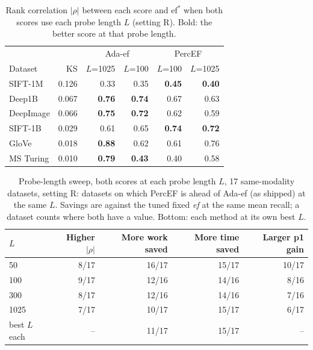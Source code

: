 \documentclass[sigconf, nonacm]{acmart}
\newcommand{\ef}{\textit{ef}}
\begin{document}
\begin{table}[t]
  \caption{Rank correlation $|\rho|$ between each score and $\mathrm{ef}^*$ when both scores use
  each probe length $L$ (setting R). Bold: the better score at that probe length.}
  \label{tab:ablation}
  \centering\footnotesize
  \begin{tabular}{lrrrrr}
    \toprule
    & & \multicolumn{2}{c}{Ada-ef} & \multicolumn{2}{c}{PercEF} \\
    Dataset & KS & $L$=1025 & $L$=100 & $L$=100 & $L$=1025 \\
    \midrule
    SIFT-1M   & 0.126 & 0.33 & 0.35 & \textbf{0.45} & \textbf{0.40} \\
    Deep1B    & 0.067 & \textbf{0.76} & \textbf{0.74} & 0.67 & 0.63 \\
    DeepImage & 0.066 & \textbf{0.75} & \textbf{0.72} & 0.62 & 0.59 \\
    SIFT-1B   & 0.029 & 0.61 & 0.65 & \textbf{0.74} & \textbf{0.72} \\
    GloVe     & 0.018 & \textbf{0.88} & 0.62 & 0.61 & 0.76 \\
    MS Turing & 0.010 & \textbf{0.79} & \textbf{0.43} & 0.40 & 0.58 \\
    \bottomrule
  \end{tabular}
\end{table}

\begin{table}[t]
  \caption{Probe-length sweep, both scores at each probe length $L$, 17 same-modality datasets,
  setting R: datasets on which PercEF is ahead of Ada-ef (as shipped) at the same $L$. Savings are
  against the tuned fixed \ef{} at the same mean recall; a dataset counts where both have a value.
  Bottom: each method at its own best $L$.}
  \label{tab:probes}
  \centering\footnotesize\setlength{\tabcolsep}{3.5pt}
  \begin{tabular}{lrrrr}
    \toprule
    $L$ & Higher $|\rho|$ & More work saved & More time saved & Larger p1 gain \\
    \midrule
    50   &  8/17 & 16/17 & 15/17 & 10/17 \\
    100  &  9/17 & 12/16 & 14/16 &  8/16 \\
    300  &  8/17 & 12/16 & 14/16 &  7/16 \\
    1025 &  7/17 & 10/17 & 15/17 &  6/17 \\
    \midrule
    best $L$ each & -- & 11/17 & 15/17 & -- \\
    \bottomrule
  \end{tabular}
\end{table}
\end{document}
